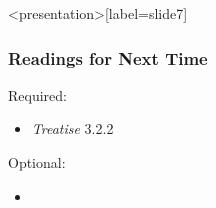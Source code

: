 % 

\begin{frame}<presentation>[label=slide7]
    \frametitle{Readings for Next Time}
        Required:
            \begin{itemize}
                \item \emph{Treatise} 3.2.2
            \end{itemize}
        Optional:
            \begin{itemize}
                \item 
            \end{itemize}
\end{frame}



